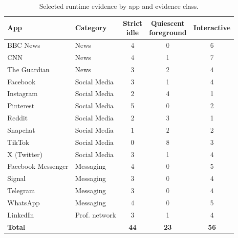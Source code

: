 \begin{table}[!t]
\centering
\caption{Selected runtime evidence by app and evidence class.}
\label{tab:cutoff-evidence-summary}
\scriptsize
\setlength{\tabcolsep}{2.5pt}
\renewcommand{\arraystretch}{1.03}
\begin{tabular}{@{}llccc@{}}
\toprule
App & Category & \shortstack{Strict\\idle} & \shortstack{Quiescent\\foreground} & Interactive \\
\midrule
BBC News & News & 4 & 0 & 6 \\
CNN & News & 4 & 1 & 7 \\
The Guardian & News & 3 & 2 & 4 \\
Facebook & Social Media & 3 & 1 & 4 \\
Instagram & Social Media & 2 & 4 & 1 \\
Pinterest & Social Media & 5 & 0 & 2 \\
Reddit & Social Media & 2 & 3 & 1 \\
Snapchat & Social Media & 1 & 2 & 2 \\
TikTok & Social Media & 0 & 8 & 3 \\
X (Twitter) & Social Media & 3 & 1 & 4 \\
Facebook Messenger & Messaging & 4 & 0 & 5 \\
Signal & Messaging & 3 & 0 & 4 \\
Telegram & Messaging & 3 & 0 & 4 \\
WhatsApp & Messaging & 4 & 0 & 5 \\
LinkedIn & Prof. network & 3 & 1 & 4 \\
\midrule
\textbf{Total} & & \textbf{44} & \textbf{23} & \textbf{56} \\
\bottomrule
\end{tabular}
\end{table}
